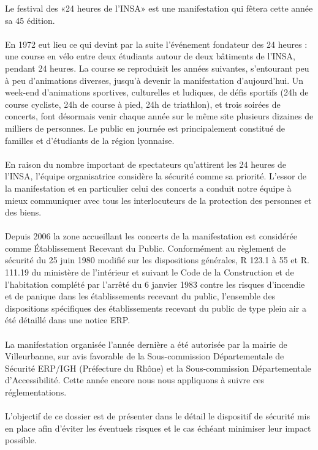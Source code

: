 \documentclass[hidelinks, paper=a4, fontsize=13pt]{report}
\begin{document}
Le festival des «24 heures de l’INSA» est une manifestation qui fêtera cette année sa 45  édition. \\\\
En 1972 eut lieu ce qui devint par la suite l’événement fondateur des 24 heures : une course en vélo entre deux étudiants autour de deux bâtiments de l’INSA, pendant 24 heures. La course se reproduisit les années suivantes, s’entourant peu à peu d’animations diverses, jusqu'à devenir la manifestation d’aujourd'hui. Un week-end d’animations sportives, culturelles et ludiques, de défis sportifs (24h de course cycliste, 24h de course à pied, 24h de triathlon), et trois soirées de concerts, font désormais venir chaque année sur le même site plusieurs dizaines de milliers de personnes. Le public en journée est principalement constitué de familles et d’étudiants de la région lyonnaise. \\\\
En raison du nombre important de spectateurs qu’attirent les 24 heures de l'INSA, l'équipe organisatrice considère la sécurité comme sa priorité. L'essor de la manifestation et en particulier celui des concerts a conduit notre équipe à mieux communiquer avec tous les interlocuteurs de la protection des personnes et des biens.\\\\
Depuis 2006 la zone accueillant les concerts de la manifestation est considérée comme Établissement Recevant du Public. Conformément au règlement de sécurité du 25 juin 1980 modifié sur les dispositions générales, R 123.1 à 55 et R. 111.19 du ministère de l’intérieur et suivant le Code de la Construction et de l’habitation complété par l’arrêté du 6 janvier 1983 contre les risques d’incendie et de panique dans les établissements recevant du public, l’ensemble des dispositions spécifiques des établissements recevant du public de type plein air a été détaillé dans une notice ERP.\\\\
La manifestation organisée l’année dernière a été autorisée par la mairie de Villeurbanne, sur avis favorable de la Sous-commission Départementale de Sécurité ERP/IGH (Préfecture du Rhône) et la Sous-commission Départementale d’Accessibilité. Cette année encore nous nous appliquons à suivre ces réglementations.\\\\
L'objectif de ce dossier est de présenter dans le détail le dispositif de sécurité mis en place afin d'éviter les éventuels risques et le cas échéant minimiser leur impact possible. \\\\
\end{document}
